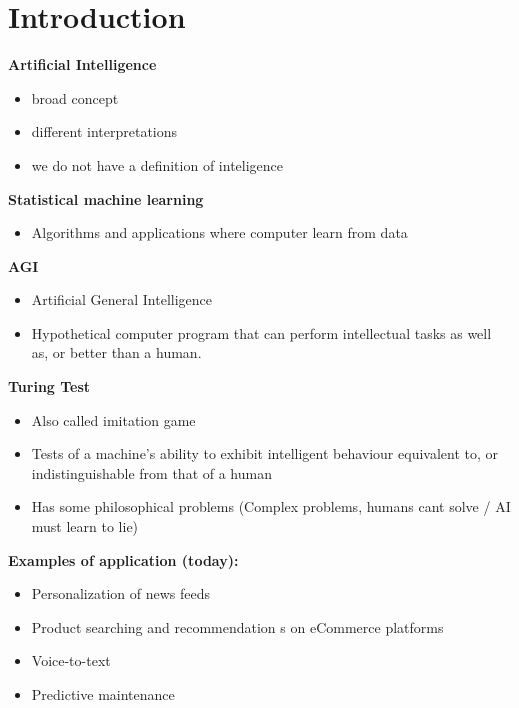 
\section{Introduction}
\textbf{Artificial Intelligence}
\begin{itemize}
    \item broad concept
    \item different interpretations
    \item we do not have a definition of inteligence
\end{itemize}
\textbf{Statistical machine learning}
\begin{itemize}
    \item Algorithms and applications where computer learn from data
\end{itemize}
\textbf{AGI}
\begin{itemize}
    \item Artificial General Intelligence
    \item Hypothetical computer program that can perform intellectual tasks as well as, or better than a human.
\end{itemize}
\textbf{Turing Test}
\begin{itemize}
    \item Also called imitation game
    \item Tests of a machine's ability to exhibit intelligent behaviour equivalent to, or indistinguishable from that of a human
    \item Has some philosophical problems (Complex problems, humans cant solve / AI must learn to lie)
\end{itemize}
\textbf{Examples of application (today):}
\begin{itemize}
    \item Personalization of news feeds
    \item Product searching and recommendation s on eCommerce platforms
    \item Voice-to-text
    \item Predictive maintenance
\end{itemize}
